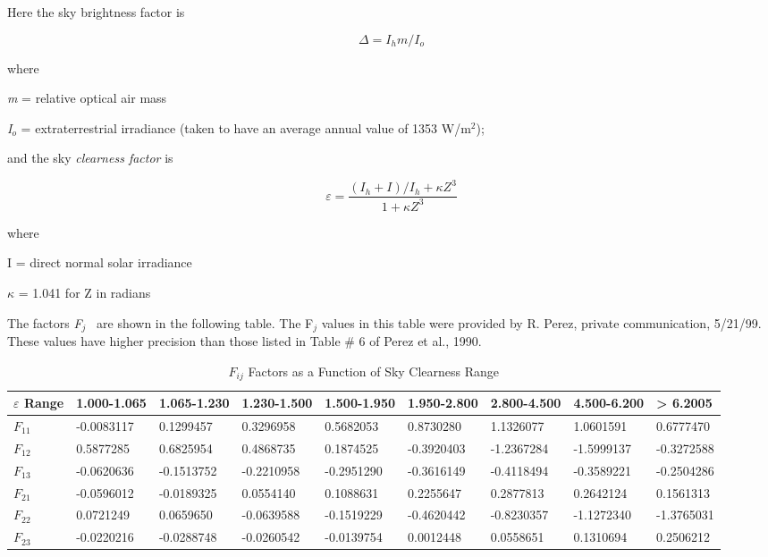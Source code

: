 Here the sky brightness factor is

\begin{equation}
\Delta  = {I_h}m/{I_o}
\end{equation}

where

\emph{m} = relative optical air mass

\emph{I\(_{o}\)} = extraterrestrial irradiance (taken to have an average annual value of 1353 W/m\(^{2}\));

and the sky \emph{clearness factor} is

\begin{equation}
\varepsilon  = \frac{{({I_h} + I)/{I_h} + \kappa {Z^3}}}{{1 + \kappa {Z^3}}}
\end{equation}

where

I = direct normal solar irradiance

$\kappa$ = 1.041 for Z in radians

The factors \emph{F\(_{j}\)} ~are shown in the following table. The F\(_{j}\) values in this table were provided by R. Perez, private communication, 5/21/99. These values have higher precision than those listed in Table \# 6 of Perez et al., 1990.

\scriptsize{
\begin{longtable}[c]{p{0.4in}p{0.6in}p{0.6in}p{0.6in}p{0.6in}p{0.6in}p{0.6in}p{0.6in}p{0.6in}}
\caption{$F_{ij}$ Factors as a Function of Sky Clearness Range \label{table:fij-factors-as-a-function-of-sky-clearness}}\\
\toprule 
\textbf{$\varepsilon$ Range} & \textbf{1.000-1.065} & \textbf{1.065-1.230} & \textbf{1.230-1.500} & \textbf{1.500-1.950} & \textbf{1.950-2.800} & \textbf{2.800-4.500} & \textbf{4.500-6.200} & \textbf{> 6.2005} \tabularnewline \midrule
\textbf{$F_{11}$} & -0.0083117 & 0.1299457 & 0.3296958 & 0.5682053 & 0.8730280 & 1.1326077 & 1.0601591 & 0.6777470 \tabularnewline \midrule
\textbf{$F_{12}$} & 0.5877285 & 0.6825954 & 0.4868735 & 0.1874525 & -0.3920403 & -1.2367284 & -1.5999137 & -0.3272588 \tabularnewline \midrule
\textbf{$F_{13}$} & -0.0620636 & -0.1513752 & -0.2210958 & -0.2951290 & -0.3616149 & -0.4118494 & -0.3589221 & -0.2504286 \tabularnewline \midrule
\textbf{$F_{21}$} & -0.0596012 & -0.0189325 & 0.0554140 & 0.1088631 & 0.2255647 & 0.2877813 & 0.2642124 & 0.1561313 \tabularnewline \midrule
\textbf{$F_{22}$} & 0.0721249 & 0.0659650 & -0.0639588 & -0.1519229 & -0.4620442 & -0.8230357 & -1.1272340 & -1.3765031 \tabularnewline \midrule
\textbf{$F_{23}$} & -0.0220216 & -0.0288748 & -0.0260542 & -0.0139754 & 0.0012448 & 0.0558651 & 0.1310694 & 0.2506212 \tabularnewline \midrule
\bottomrule
\end{longtable}}

